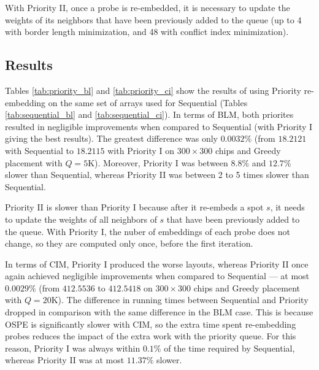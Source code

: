 With Priority II, once a probe is re-embedded, it is necessary to update the
weights of its neighbors that have been previously added to the queue (up to 4
with border length minimization, and 48 with conflict index minimization).

\subsection{Results}

Tables \ref{tab:priority_bl} and \ref{tab:priority_ci} show the results of
using Priority re-embedding on the same set of arrays used for Sequential
(Tables \ref{tab:sequential_bl} and \ref{tab:sequential_ci}). In terms of BLM,
both priorites resulted in negligible improvements when compared to Sequential
(with Priority I giving the best results). The greatest difference was only
$0.0032\%$ (from $18.2121$ with Sequential to $18.2115$ with Priority I on
$300\times 300$ chips and Greedy placement with $Q=5$K). Moreover, Priority I
was between $8.8\%$ and $12.7\%$ slower than Sequential, whereas Priority II was
between 2 to 5 times slower than Sequential.

Priority II is slower than Priority I because after it re-embeds a spot $s$, it
needs to update the weights of all neighbors of $s$ that have been previously
added to the queue. With Priority I, the nuber of embeddings of each probe does
not change, so they are computed only once, before the first iteration.

In terms of CIM, Priority I produced the worse layouts, whereas Priority II once
again achieved negligible improvements when compared to Sequential --- at most
$0.0029\%$ (from $412.5536$ to $412.5418$ on $300\times 300$ chips and Greedy
placement with $Q=20$K). The difference in running times between Sequential and
Priority dropped in comparison with the same difference in the BLM case. This is
because OSPE is significantly slower with CIM, so the extra time spent
re-embedding probes reduces the impact of the extra work with the priority
queue. For this reason, Priority I was always within $0.1\%$ of the time
required by Sequential, whereas Priority II was at most $11.37\%$ slower.


